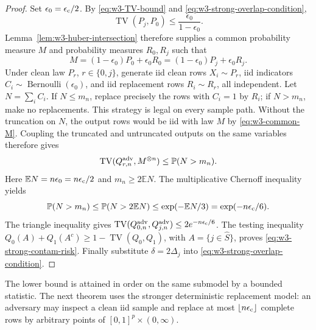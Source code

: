\documentclass[11pt]{article}
\theoremstyle{remark}
\newcommand{\Pp}{\mathbb P}
\newcommand{\E}{\mathbb E}
\newcommand{\TV}{\operatorname{TV}}
\begin{document}
\begin{proof}
Set $\epsilon_0=\epsilon_{\rm c}/2$.  By
\eqref{eq:w3-TV-bound} and \eqref{eq:w3-strong-overlap-condition},
\begin{equation*}
 \TV(P_j,P_0)\le\frac{\epsilon_0}{1-\epsilon_0}.
\end{equation*}
Lemma~\ref{lem:w3-huber-intersection} therefore supplies a common probability
measure $M$ and probability measures $R_0,R_j$ such that
\begin{equation}
 M=(1-\epsilon_0)P_0+\epsilon_0R_0
  =(1-\epsilon_0)P_j+\epsilon_0R_j.
 \label{eq:w3-common-M}
\end{equation}
Under clean law $P_r$, $r\in\{0,j\}$, generate iid clean rows $X_i\sim P_r$,
iid indicators $C_i\sim\operatorname{Bernoulli}(\epsilon_0)$, and iid
replacement rows $R_i\sim R_r$, all independent.  Let
$N=\sum_iC_i$.  If $N\le m_n$, replace precisely the rows with $C_i=1$ by
$R_i$; if $N>m_n$, make no replacements.  This strategy is legal on every
sample path.  Without the truncation on $N$, the output rows would be iid with
law $M$ by \eqref{eq:w3-common-M}.  Coupling the truncated and untruncated
outputs on the same variables therefore gives
\begin{equation}
 \TV(Q_{r,n}^{\rm adv},M^{\otimes n})
 \le\Pp(N>m_n).
 \label{eq:w3-truncated-TV}
\end{equation}
Here $\E N=n\epsilon_0=n\epsilon_{\rm c}/2$ and
$m_n\ge2\E N$.  The multiplicative Chernoff inequality yields
\begin{equation}
 \Pp(N>m_n)\le\Pp(N>2\E N)
 \le\exp(-\E N/3)=\exp(-n\epsilon_{\rm c}/6).
 \label{eq:w3-binomial-truncation}
\end{equation}
The triangle inequality gives
$\TV(Q_{0,n}^{\rm adv},Q_{j,n}^{\rm adv})
\le2e^{-n\epsilon_{\rm c}/6}$.  The testing inequality
$Q_0(A)+Q_1(A^c)\ge1-\TV(Q_0,Q_1)$, with
$A=\{j\in\widehat S\}$, proves \eqref{eq:w3-strong-contam-risk}.  Finally
substitute $\delta=2\Delta_j$ into
\eqref{eq:w3-strong-overlap-condition}.
\end{proof}

The lower bound is attained in order on the same submodel by a bounded
statistic.  The next theorem uses the stronger deterministic replacement
model: an adversary may inspect a clean iid sample and replace at most
$\lfloor n\epsilon_{\rm c}\rfloor$ complete rows by arbitrary points of
$[0,1]^p\times(0,\infty)$.
\end{document}
